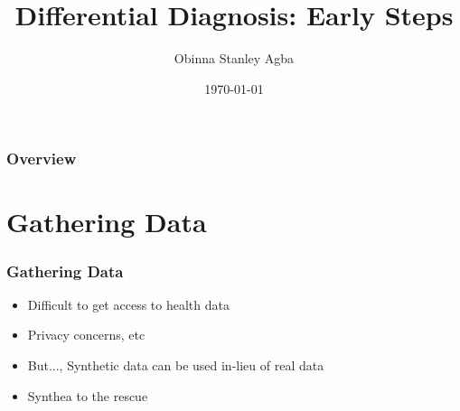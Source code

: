 \documentclass{beamer}
\title[An Update]{Differential Diagnosis: Early Steps} %
\author{Obinna Stanley Agba} %
\institute[TU Delft] %
{
Delft Technical University \\ %
\medskip
\textit{o.s.agba@student.tudelft.nl} %
}
\date{\today} %
\begin{document}
\begin{frame}
\titlepage %
\end{frame}

\begin{frame}
\frametitle{Overview} %
\tableofcontents %
\end{frame}


\section{Gathering Data} %

\begin{frame}
\frametitle{Gathering Data}
\begin{itemize}
	\item Difficult to get access to health data
	\item Privacy concerns, etc
	\item But..., Synthetic data can be used in-lieu of real data
	\item Synthea to the rescue
\end{itemize}
\end{frame}
\end{document}

